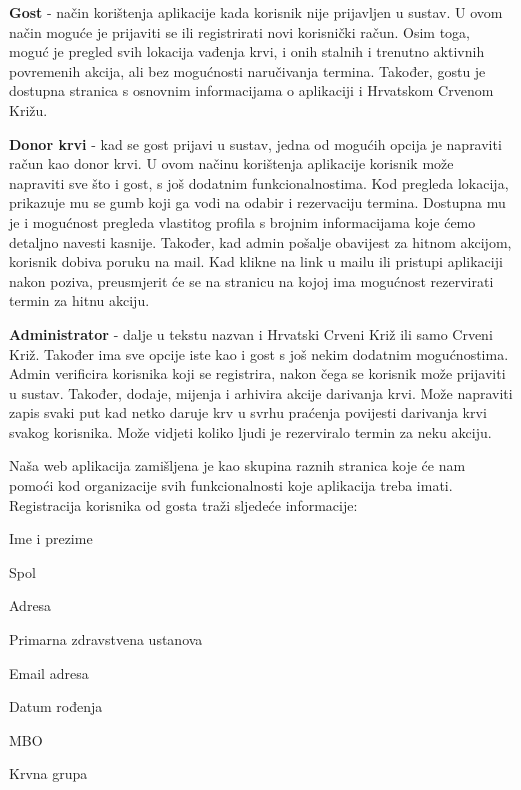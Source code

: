 		\begin{packed_item}
				\item \textbf{Gost} - način korištenja aplikacije kada korisnik nije prijavljen u sustav. U ovom način moguće je prijaviti se ili registrirati novi korisnički račun. Osim toga, moguć je pregled svih lokacija vađenja krvi, i onih stalnih i trenutno aktivnih povremenih akcija, ali bez mogućnosti naručivanja termina. Također, gostu je dostupna stranica s osnovnim informacijama o aplikaciji i Hrvatskom Crvenom Križu.
				\item \textbf{Donor krvi} - kad se gost prijavi u sustav, jedna od mogućih opcija je napraviti račun kao donor krvi. U ovom načinu korištenja aplikacije korisnik može napraviti sve što i gost, s još dodatnim funkcionalnostima. Kod pregleda lokacija, prikazuje mu se gumb koji ga vodi na odabir i rezervaciju termina. Dostupna mu je i mogućnost pregleda vlastitog profila s brojnim informacijama koje ćemo detaljno navesti kasnije. Također, kad admin pošalje obavijest za hitnom akcijom, korisnik dobiva poruku na mail. Kad klikne na link u mailu ili pristupi aplikaciji nakon poziva, preusmjerit će se na stranicu na kojoj ima mogućnost rezervirati termin za hitnu akciju.
				\item \textbf{Administrator} - dalje u tekstu nazvan i Hrvatski Crveni Križ ili samo Crveni Križ. Također ima sve opcije iste kao i gost s još nekim dodatnim mogućnostima. Admin verificira korisnika koji se registrira, nakon čega se korisnik može prijaviti u sustav. Također, dodaje, mijenja i arhivira akcije darivanja krvi. Može napraviti zapis svaki put kad netko daruje krv u svrhu praćenja povijesti darivanja krvi svakog korisnika. Može vidjeti koliko ljudi je rezerviralo termin za neku akciju.
		\end{packed_item}

		Naša web aplikacija zamišljena je kao skupina raznih stranica koje će nam pomoći kod organizacije svih funkcionalnosti koje aplikacija treba imati. Registracija korisnika od gosta traži sljedeće informacije:

		\begin{packed_item}
				\item Ime i prezime
				\item Spol
				\item Adresa
				\item Primarna zdravstvena ustanova
				\item Email adresa
				\item Datum rođenja
				\item MBO
				\item Krvna grupa
		\end{packed_item}

